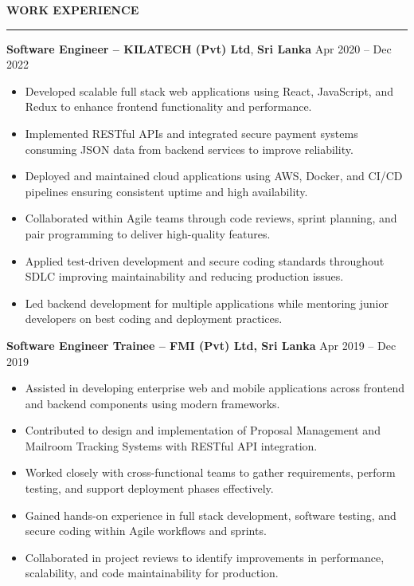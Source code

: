 \documentclass[10pt,letterpaper]{article}
\begin{document}
\textbf{WORK EXPERIENCE}\\[-8pt]
\noindent\rule{\textwidth}{1pt}

\vspace{-2pt}

\textbf{Software Engineer -- KILATECH (Pvt) Ltd}, \textbf{Sri Lanka} \hfill Apr 2020 -- Dec 2022

\vspace{-1pt}

\begin{itemize}
\item Developed scalable full stack web applications using React, JavaScript, and Redux to enhance frontend functionality and performance.
\item Implemented RESTful APIs and integrated secure payment systems consuming JSON data from backend services to improve reliability.
\item Deployed and maintained cloud applications using AWS, Docker, and CI/CD pipelines ensuring consistent uptime and high availability.
\item Collaborated within Agile teams through code reviews, sprint planning, and pair programming to deliver high-quality features.
\item Applied test-driven development and secure coding standards throughout SDLC improving maintainability and reducing production issues.
\item Led backend development for multiple applications while mentoring junior developers on best coding and deployment practices.
\end{itemize}

\textbf{Software Engineer Trainee -- FMI (Pvt) Ltd, Sri Lanka} \hfill Apr 2019 -- Dec 2019

\vspace{-1pt}

\begin{itemize}
\item Assisted in developing enterprise web and mobile applications across frontend and backend components using modern frameworks.
\item Contributed to design and implementation of Proposal Management and Mailroom Tracking Systems with RESTful API integration.
\item Worked closely with cross-functional teams to gather requirements, perform testing, and support deployment phases effectively.
\item Gained hands-on experience in full stack development, software testing, and secure coding within Agile workflows and sprints.
\item Collaborated in project reviews to identify improvements in performance, scalability, and code maintainability for production.
\end{itemize}
\end{document}

